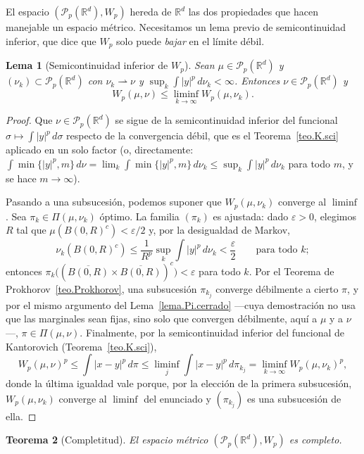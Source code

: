\documentclass[12pt, a4paper]{amsbook}
\newcommand{\R}{{\mathbb R}}
\newtheorem{teo}{Teorema}[section]
\newtheorem{lema}[teo]{Lema}
\theoremstyle{remark}
\theoremstyle{definition}
\numberwithin{section}{chapter}
\numberwithin{subsection}{section}
\numberwithin{equation}{section}
\numberwithin{figure}{chapter}
\begin{document}
El espacio $(\mathcal P_p(\R^d),W_p)$ hereda de $\R^d$ las dos propiedades
que hacen manejable un espacio métrico. Necesitamos un lema previo de
semicontinuidad inferior, que dice que $W_p$ solo puede \emph{bajar} en el
límite débil.

\begin{lema}[Semicontinuidad inferior de $W_p$]\label{lema.Wp.sci}
Sean $\mu\in\mathcal P_p(\R^d)$ y $(\nu_k)\subset\mathcal P_p(\R^d)$ con
$\nu_k\rightharpoonup\nu$ y $\sup_k\int|y|^p\,d\nu_k<\infty$. Entonces
$\nu\in\mathcal P_p(\R^d)$ y
\[
W_p(\mu,\nu)\le\liminf_{k\to\infty}W_p(\mu,\nu_k).
\]
\end{lema}

\begin{proof}
Que $\nu\in\mathcal P_p(\R^d)$ se sigue de la semicontinuidad inferior del
funcional $\sigma\mapsto\int|y|^p\,d\sigma$ respecto de la convergencia
débil, que es el Teorema~\ref{teo.K.sci} aplicado en un solo factor (o,
directamente: $\int\min\{|y|^p,m\}\,d\nu=\lim_k\int\min\{|y|^p,m\}\,d\nu_k\le\sup_k\int|y|^p\,d\nu_k$
para todo $m$, y se hace $m\to\infty$).

Pasando a una subsucesión, podemos suponer que $W_p(\mu,\nu_k)$ converge al
$\liminf$. Sea $\pi_k\in\Pi(\mu,\nu_k)$ óptimo. La familia $(\pi_k)$ es
ajustada: dado $\varepsilon>0$, elegimos $R$ tal que
$\mu(B(0,R)^c)<\varepsilon/2$ y, por la desigualdad de Markov,
\[
\nu_k(B(0,R)^c)\le\frac{1}{R^p}\sup_k\int|y|^p\,d\nu_k<\frac\varepsilon2
\qquad\text{para todo }k;
\]
entonces $\pi_k\bigl((\overline{B(0,R)}\times\overline{B(0,R)})^c\bigr)<\varepsilon$
para todo $k$. Por el Teorema de Prokhorov~\ref{teo.Prokhorov}, una
subsucesión $\pi_{k_j}$ converge débilmente a cierto $\pi$, y por el
mismo argumento del Lema~\ref{lema.Pi.cerrado} —cuya demostración no usa
que las marginales sean fijas, sino solo que convergen débilmente, aquí a
$\mu$ y a $\nu$—, $\pi\in\Pi(\mu,\nu)$. Finalmente, por la
semicontinuidad inferior del funcional de Kantorovich
(Teorema~\ref{teo.K.sci}),
\[
W_p(\mu,\nu)^p\le\int|x-y|^p\,d\pi\le\liminf_j\int|x-y|^p\,d\pi_{k_j}
=\liminf_{k\to\infty}W_p(\mu,\nu_k)^p,
\]
donde la última igualdad vale porque, por la elección de la primera
subsucesión, $W_p(\mu,\nu_k)$ converge al $\liminf$ del enunciado y
$(\pi_{k_j})$ es una subsucesión de ella.
\end{proof}

\begin{teo}[Completitud]\label{teo.Wp.completo}
El espacio métrico $(\mathcal P_p(\R^d),W_p)$ es completo.
\end{teo}
\end{document}
